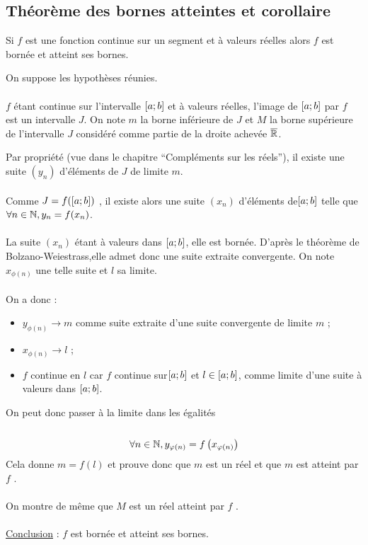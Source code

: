 \subsection{Théorème des bornes atteintes et corollaire}
\begin{theo}
    Si \(f\) est une fonction continue sur un segment et à valeurs réelles alors \(f\) est bornée et atteint ses bornes.
\end{theo}
\begin{dem}
    On suppose les hypothèses réunies.\\~\\
    \(f\) étant continue sur l’intervalle \(\left[a;b\right]\) et à valeurs réelles, l’image de \(\left[a;b\right]\) par \(f\) est un intervalle \(J\). On note \(m\) la borne inférieure de \(J\) et \(M\) la borne supérieure de l’intervalle \(J\) considéré comme partie de la droite achevée \(\overline{\mathbb{R}}\).

    Par propriété (vue dans le chapitre “Compléments sur les réels”), il existe une suite \((y_n)\) d’éléments de \(J\) de limite \(m\).\\~\\
    Comme \(J = f (\left[a;b\right])\) , il existe alors une suite \((x_n)\) d’éléments de\( \left[a;b\right]\) telle que \(\forall n \in \mathbb{N}, y_n = f (x_n)\).\\~\\
    La suite \((x_n)\) étant à valeurs dans \(\left[a;b\right]\), elle est bornée. D’après le théorème de Bolzano-Weiestrass,elle admet donc une suite extraite convergente. On note \(x_{\phi(n)}\) une telle suite et \(l\) sa limite.\\~\\
    On a donc :
    \begin{itemize}
        \item  \(y_{\phi(n)} \to  m\) comme suite extraite d’une suite convergente de limite \(m\) ;
        \item \(x_{\phi(n)} \to l\)  ;
        \item \(f\) continue en \(l\) car \(f\) continue sur\( \left[a;b\right]\) et \(l \in \left[a;b\right]\), comme limite d’une suite à valeurs dans \(\left[a;b\right]\).
    \end{itemize}
    On peut donc passer à la limite dans les égalités\\~\\
    \[\forall n \in \mathbb{N}, y_{\varphi(n)} = f\left(x_{\varphi(n)}\right)\]
    Cela donne \(m = f (l)\) et prouve donc que \(m\) est un réel et que \(m\) est atteint par \(f\) .\\~\\
    On montre de même que \(M\) est un réel atteint par \(f\) .\\~\\
    \underline{Conclusion} : \(f\) est bornée et atteint ses bornes.
\end{dem}

